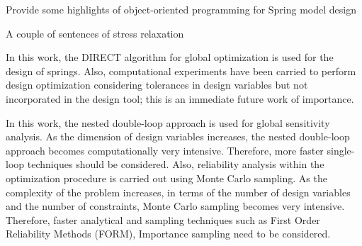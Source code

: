 \documentclass[11pt]{article}
\begin{document}
\vspace{6 mm}
\hspace{5 mm} Provide some highlights of object-oriented programming for Spring model design
\vspace{6 mm}

\hspace{5 mm} A couple of sentences of stress relaxation

\vspace{6 mm}

\hspace{5 mm} In this work, the DIRECT algorithm for global optimization is used for the design of springs. Also, computational experiments have been carried to perform design optimization considering tolerances in design variables but not incorporated in the design tool; this is an immediate future work of importance. 

\hspace{5 mm} In this work, the nested double-loop approach is used for global sensitivity analysis. As the dimension of design variables increases, the nested double-loop approach becomes computationally very intensive. Therefore, more faster single-loop techniques should be considered. Also, reliability analysis within the optimization procedure is carried out using Monte Carlo sampling. As the complexity of the problem increases, in terms of the number of design variables and the number of constraints, Monte Carlo sampling becomes very intensive. Therefore, faster analytical and sampling techniques such as First Order Reliability Methods (FORM), Importance sampling need to be considered.

	

\vfill\pagebreak

	
	



		

	
\end{document}
